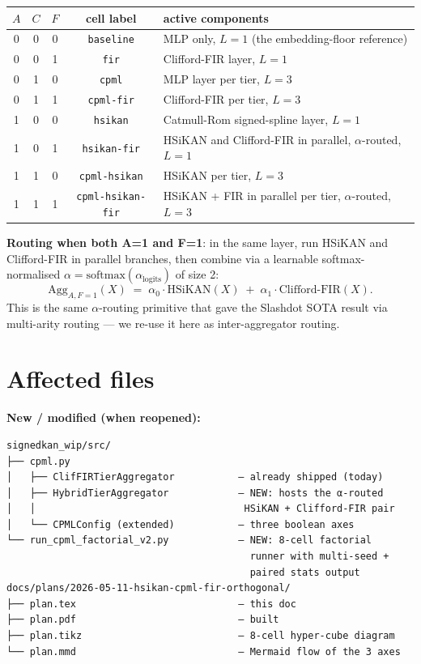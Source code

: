 \documentclass[11pt]{article}
\begin{document}
\begin{center}
\renewcommand{\arraystretch}{1.25}
\begin{tabular}{|c|c|c|c|l|}
\hline
$A$ & $C$ & $F$ & cell label & active components \\
\hline
0 & 0 & 0 & \texttt{baseline}      & MLP only, $L=1$ (the embedding-floor reference) \\
0 & 0 & 1 & \texttt{fir}           & Clifford-FIR layer, $L=1$ \\
0 & 1 & 0 & \texttt{cpml}          & MLP layer per tier, $L=3$ \\
0 & 1 & 1 & \texttt{cpml-fir}      & Clifford-FIR per tier, $L=3$ \\
1 & 0 & 0 & \texttt{hsikan}        & Catmull-Rom signed-spline layer, $L=1$ \\
1 & 0 & 1 & \texttt{hsikan-fir}    & HSiKAN and Clifford-FIR in parallel, $\alpha$-routed, $L=1$ \\
1 & 1 & 0 & \texttt{cpml-hsikan}   & HSiKAN per tier, $L=3$ \\
1 & 1 & 1 & \texttt{cpml-hsikan-fir} & HSiKAN + FIR in parallel per tier, $\alpha$-routed, $L=3$ \\
\hline
\end{tabular}
\end{center}

\textbf{Routing when both A=1 and F=1}: in the same layer, run
HSiKAN and Clifford-FIR in parallel branches, then combine via a
learnable softmax-normalised $\alpha = \mathrm{softmax}(\alpha_{\mathrm{logits}})$
of size 2:
\[
  \mathrm{Agg}_{A,F=1}(X) \;=\; \alpha_0 \cdot \mathrm{HSiKAN}(X) \;+\; \alpha_1 \cdot \mathrm{Clifford\text{-}FIR}(X).
\]
This is the same $\alpha$-routing primitive that gave the
Slashdot SOTA result via multi-arity routing — we re-use it here
as inter-aggregator routing.

\section{Affected files}

\textbf{New / modified (when reopened):}
\begin{lstlisting}
signedkan_wip/src/
├── cpml.py
│   ├── ClifFIRTierAggregator           — already shipped (today)
│   ├── HybridTierAggregator            — NEW: hosts the α-routed
│   │                                    HSiKAN + Clifford-FIR pair
│   └── CPMLConfig (extended)           — three boolean axes
└── run_cpml_factorial_v2.py            — NEW: 8-cell factorial
                                          runner with multi-seed +
                                          paired stats output
docs/plans/2026-05-11-hsikan-cpml-fir-orthogonal/
├── plan.tex                            — this doc
├── plan.pdf                            — built
├── plan.tikz                           — 8-cell hyper-cube diagram
└── plan.mmd                            — Mermaid flow of the 3 axes
\end{lstlisting}
\end{document}
